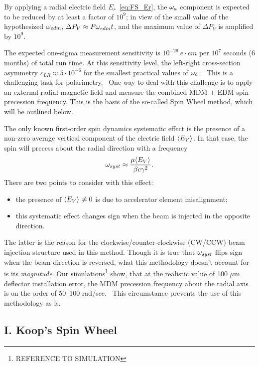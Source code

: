 \documentclass{article}
\begin{document}
By applying a radial electric field $E_r$~\eqref{eq:FS_Er}, the $\omega_a$ component is expected to be reduced by at least a factor of $10^9$; in view of the small value of the hypothesized $\omega_{edm}$, $\Delta P_V \approx P \omega_{edm} t$, and the maximum value of $\Delta P_V$ is amplified by $10^9$.

The expected one-sigma measurement sensitivity is $10^{-29}~e\cdot cm$ per $10^7$ seconds (6 months) of total run time. At this sensitivity level, the left-right cross-section asymmetry $\varepsilon_{LR} \approx 5\cdot 10^{-6}$ for the smallest practical values of $\omega_a$.~\cite[p. 18]{BNL:Deuteron2008} This is a challenging task for polarimetry.~\cite{Mane:SpinWheel} One way to deal with this challenge is to apply an external radial magnetic field and measure the combined MDM + EDM spin precession frequency. This is the basis of the so-called Spin Wheel method, which will be outlined below.

The only known first-order spin dynamics systematic effect is the presence of a non-zero average vertical component of the electric field $\avg{E_V}$. In that case, the spin will precess about the radial direction with a frequency~\cite[p. 11]{BNL:Deuteron2008}
\[
\w_{syst} \approx \frac{\mu\avg{E_V}}{\beta c\gamma^2}.
\]
There are two points to consider with this effect:
\begin{itemize}
\item the presence of $\avg{E_V}\neq 0$ is due to accelerator element misalignment;
\item this systematic effect changes sign when the beam is injected in the opposite direction.
\end{itemize}
The latter is the reason for the clockwise/counter-clockwise (CW/CCW) beam injection structure used in this method. Though it is true that $\omega_{syst}$ flips sign when the beam direction is reversed, what this methodology doesn't account for is its \emph{magnitude}. Our simulations\footnote{REFERENCE TO SIMULATION} show, that at the realistic value of 100 $\mu$m deflector installation error, the MDM precession frequency about the radial axis is on the order of 50--100 rad/sec.~\cite{Senichev:FDM} This circumstance prevents the use of this methodology as is.


\subsection{I. Koop's Spin Wheel}
\end{document}

